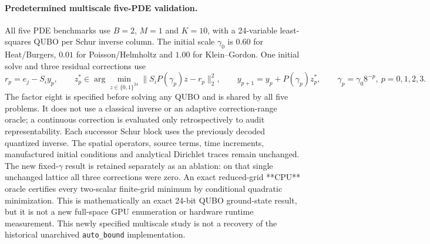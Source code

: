 
\paragraph{Predetermined multiscale five-PDE validation.}
All five PDE benchmarks use $B=2$, $M=1$ and $K=10$, with a 24-variable
least-squares QUBO per Schur inverse column. The initial scale $\gamma_0$
is $0.60$ for Heat/Burgers, $0.01$ for Poisson/Helmholtz and $1.00$
for Klein--Gordon. One initial solve and three residual corrections use
\begin{equation}
  r_p=e_j-S_i y_p,\qquad
  z_p^*\in\arg\min_{z\in\{0,1\}^{24}}\|S_i P(\gamma_p)z-r_p\|_2^2,\qquad
  y_{p+1}=y_p+P(\gamma_p)z_p^*,\qquad
  \gamma_p=\gamma_0 8^{-p},\ p=0,1,2,3.
  \label{eq:five_pde_multiscale}
\end{equation}
The factor eight is specified before solving any QUBO and is shared by all five
problems. It does not use a classical inverse or an adaptive correction-range
oracle; a continuous correction is evaluated only retrospectively to audit
representability. Each successor Schur block uses the previously decoded
quantized inverse. The spatial operators, source terms, time increments,
manufactured initial conditions and analytical Dirichlet traces remain
unchanged. The new fixed-$\gamma$ result is retained separately as an
ablation: on that single unchanged lattice all three corrections were zero.
An exact reduced-grid **CPU** oracle certifies every two-scalar finite-grid
minimum by conditional quadratic minimization. This is mathematically
an exact 24-bit QUBO ground-state result, but it is not a new full-space
GPU enumeration or hardware runtime measurement. This newly specified
multiscale study is not a recovery of the historical unarchived
\texttt{auto\_bound} implementation.


